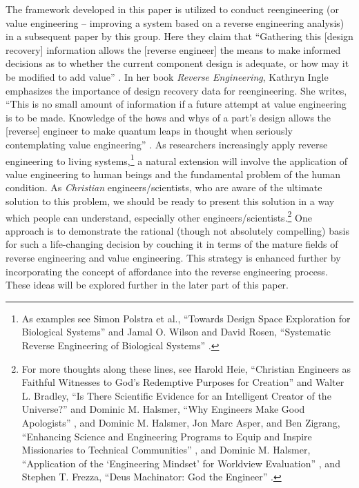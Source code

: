 The framework developed in this paper is utilized to conduct
reengineering (or value engineering – improving a system based on a
reverse engineering analysis) in a subsequent paper by this group. Here
they claim that “Gathering this [design recovery] information allows
the [reverse engineer] the means to make informed decisions as to
whether the current component design is adequate, or how may it be
modified to add value” \citep[][pg. 166]{urbanicelmaraghy2009b}. In her 
book \textit{Reverse Engineering}, Kathryn Ingle emphasizes the importance of design
recovery data for reengineering. She writes, “This is no small amount
of information if a future attempt at value engineering is to be made.
Knowledge of the hows and whys of a part’s design allows the [reverse]
engineer to make quantum leaps in thought when seriously contemplating
value engineering” \citep[][pgs. 65--66]{ingle1994}. As researchers increasingly
apply reverse engineering to living systems,\footnote{
As examples see Simon Polstra et al., “Towards
Design Space Exploration for Biological Systems” \citep{polstraetal2008}
and Jamal O. Wilson and David Rosen,
“Systematic Reverse Engineering of Biological Systems” \citep{wilsonrosen2007}.
} a
natural extension will involve the application of value engineering to
human beings and the fundamental problem of the human condition. As
\textit{Christian} engineers/scientists, who are aware of the ultimate
solution to this problem, we should be ready to present this solution
in a way which people can understand, especially other
engineers/scientists.\footnote{
For more thoughts along these lines, see Harold
Heie, “Christian Engineers as Faithful Witnesses to God’s Redemptive
Purposes for Creation” \citep{heie1999}
and Walter L. Bradley,
“Is There Scientific Evidence for an Intelligent Creator of the
Universe?” \citep{bradley2003}
and Dominic M. Halsmer, “Why Engineers Make Good Apologists” \citep{halsmer2007},
 and Dominic M. Halsmer, Jon Marc Asper, and Ben Zigrang,
“Enhancing Science and Engineering Programs to Equip and Inspire
Missionaries to Technical Communities” \citep{halsmeretal2011},
and Dominic M. Halsmer,
“Application of the ‘Engineering Mindset’ for Worldview Evaluation” \citep{halsmer2009},
and Stephen T. Frezza, “Deus Machinator: God the Engineer” \citep{frezza2009}.
} One approach is to
demonstrate the rational (though not absolutely compelling) basis for
such a life-changing decision by couching it in terms of the mature
fields of reverse engineering and value engineering. This strategy is
enhanced further by incorporating the concept of affordance into the
reverse engineering process. These ideas will be explored further in
the later part of this paper.

